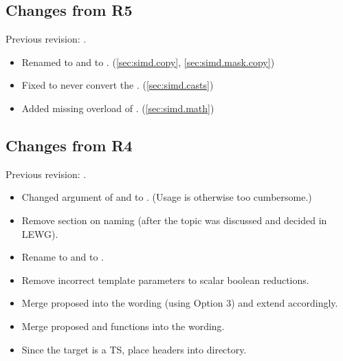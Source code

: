 \subsection{Changes from R5}
Previous revision: \parencite{P0214R5}.
\begin{itemize}
  \item Renamed  to  and  to . (\ref{sec:simd.copy}, \ref{sec:simd.mask.copy})
  \item Fixed  to never convert the . (\ref{sec:simd.casts})
  \item Added missing  overload of . (\ref{sec:simd.math})
\end{itemize}

\subsection{Changes from R4}
Previous revision: \parencite{P0214R4}.
\begin{itemize}
  \item Changed  argument of  and  to .
    (Usage is otherwise too cumbersome.)
  \item Remove section on naming (after the topic was discussed and decided in LEWG).
  \item Rename  to  and  to .
  \item Remove incorrect template parameters to scalar boolean reductions.
  \item Merge proposed  into the wording (using Option 3) and extend  accordingly.
  \item Merge proposed  and  functions into the wording.
  \item Since the target is a TS, place headers into  directory.
\end{itemize}

